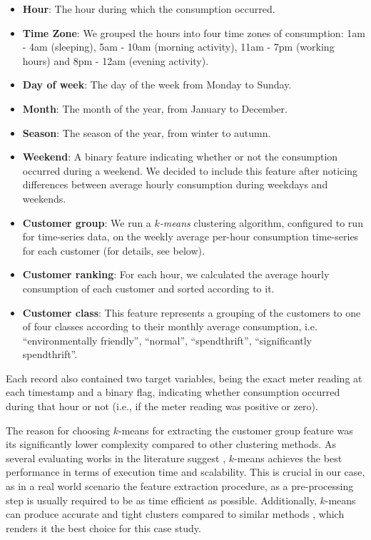 \begin{itemize}
\item \textbf{Hour}: The hour during which the consumption occurred.
\item \textbf{Time Zone}: We grouped the hours into four time zones of consumption: 1am - 4am (sleeping), 5am - 10am (morning activity), 11am - 7pm (working hours) and 8pm - 12am (evening activity).
\item \textbf{Day of week}: The day of the week from Monday to Sunday.
\item \textbf{Month}: The month of the year, from January to December.
\item \textbf{Season}: The season of the year, from winter to autumn.
\item \textbf{Weekend}: A binary feature indicating whether or not the consumption occurred during a weekend. We decided to include this feature after noticing differences between average hourly consumption during weekdays and weekends.
\item \textbf{Customer group}: We run a \textit{$k$-means} clustering algorithm, configured to run for time-series data, on the weekly average per-hour consumption time-series for each customer (for details, see below).
\item \textbf{Customer ranking}: For each hour, we calculated the average hourly consumption of each customer and sorted according to it.
\item \textbf{Customer class}: This feature represents a grouping of the customers to one of four classes according to their monthly average consumption, i.e. ``environmentally friendly'', ``normal'', ``spendthrift'', ``significantly spendthrift''.
\end{itemize}

Each record also contained two target variables, being the exact meter reading at each timestamp and a binary flag, indicating whether consumption occurred during that hour or not (i.e., if the meter reading was positive or zero).

The reason for choosing $k$-means for extracting the customer group feature was its significantly lower complexity compared to other clustering methods. As several evaluating works in the literature suggest \cite{singh2012performance,panda2012comparing,sehgal2014comparison}, $k$-means achieves the best performance in terms of execution time and scalability. This is crucial in our case, as in a real world scenario the feature extraction procedure, as a pre-processing step is usually required to be as time efficient as possible. Additionally, $k$-means can produce accurate and tight clusters compared to similar methods \cite{jung2014clustering}, which renders it the best choice for this case study.

